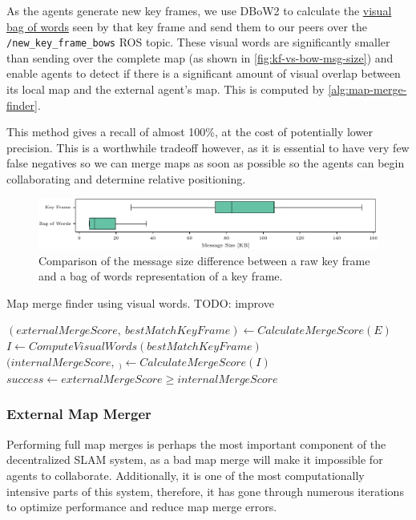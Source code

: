 As the agents generate new key frames, we use DBoW2 \autocite{GalvezTRO12} to calculate the \hyperref[sec:visual-bag-of-words]{visual bag of words} seen by that key frame and send them to our peers over the \texttt{/new\_key\_frame\_bows} ROS topic. These visual words are significantly smaller than sending over the complete map (as shown in \autoref{fig:kf-vs-bow-msg-size}) and enable agents to detect if there is a significant amount of visual overlap between its local map and the external agent's map. This is computed by \autoref{alg:map-merge-finder}.

This method gives a recall of almost 100\%, at the cost of potentially lower precision. This is a worthwhile tradeoff however, as it is essential to have very few false negatives so we can merge maps as soon as possible so the agents can begin collaborating and determine relative positioning.

\begin{figure}[h]
    \centering
    \includegraphics[width=\linewidth]{figures/apr20_mh_trajectory_g_kf_vs_bow_msg_size.pdf}
    \caption{Comparison of the message size difference between a raw key frame and a bag of words representation of a key frame.}
    \label{fig:kf-vs-bow-msg-size}
\end{figure}

\begin{algorithm}
    \caption{Map merge finder using visual words. TODO: improve}
    \label{alg:map-merge-finder}
    \begin{algorithmic}[1]
        \State $(externalMergeScore,\ bestMatchKeyFrame) \gets CalculateMergeScore(E)$
        \State $I \gets ComputeVisualWords(bestMatchKeyFrame)$
        \State $(internalMergeScore,\ _) \gets CalculateMergeScore(I)$
        \State $success \gets externalMergeScore \geq internalMergeScore$
    \end{algorithmic}
\end{algorithm}

\subsubsection{External Map Merger}
\label{sec:external-map-merger}
Performing full map merges is perhaps the most important component of the decentralized SLAM system, as a bad map merge will make it impossible for agents to collaborate. Additionally, it is one of the most computationally intensive parts of this system, therefore, it has gone through numerous iterations to optimize performance and reduce map merge errors.

